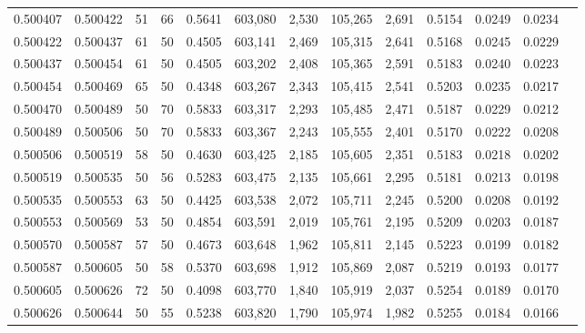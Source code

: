 \begin{tabular}{rrrrrrrrrrrrr}
0.500407 & 0.500422 &    51 &  66 &                                     0.5641 & 603,080 &   2,530 & 105,265 &   2,691 & 0.5154 & 0.0249 & 0.0234 \\
0.500422 & 0.500437 &    61 &  50 &                                     0.4505 & 603,141 &   2,469 & 105,315 &   2,641 & 0.5168 & 0.0245 & 0.0229 \\
0.500437 & 0.500454 &    61 &  50 &                                     0.4505 & 603,202 &   2,408 & 105,365 &   2,591 & 0.5183 & 0.0240 & 0.0223 \\
0.500454 & 0.500469 &    65 &  50 &                                     0.4348 & 603,267 &   2,343 & 105,415 &   2,541 & 0.5203 & 0.0235 & 0.0217 \\
0.500470 & 0.500489 &    50 &  70 &                                     0.5833 & 603,317 &   2,293 & 105,485 &   2,471 & 0.5187 & 0.0229 & 0.0212 \\
0.500489 & 0.500506 &    50 &  70 &                                     0.5833 & 603,367 &   2,243 & 105,555 &   2,401 & 0.5170 & 0.0222 & 0.0208 \\
0.500506 & 0.500519 &    58 &  50 &                                     0.4630 & 603,425 &   2,185 & 105,605 &   2,351 & 0.5183 & 0.0218 & 0.0202 \\
0.500519 & 0.500535 &    50 &  56 &                                     0.5283 & 603,475 &   2,135 & 105,661 &   2,295 & 0.5181 & 0.0213 & 0.0198 \\
0.500535 & 0.500553 &    63 &  50 &                                     0.4425 & 603,538 &   2,072 & 105,711 &   2,245 & 0.5200 & 0.0208 & 0.0192 \\
0.500553 & 0.500569 &    53 &  50 &                                     0.4854 & 603,591 &   2,019 & 105,761 &   2,195 & 0.5209 & 0.0203 & 0.0187 \\
0.500570 & 0.500587 &    57 &  50 &                                     0.4673 & 603,648 &   1,962 & 105,811 &   2,145 & 0.5223 & 0.0199 & 0.0182 \\
0.500587 & 0.500605 &    50 &  58 &                                     0.5370 & 603,698 &   1,912 & 105,869 &   2,087 & 0.5219 & 0.0193 & 0.0177 \\
0.500605 & 0.500626 &    72 &  50 &                                     0.4098 & 603,770 &   1,840 & 105,919 &   2,037 & 0.5254 & 0.0189 & 0.0170 \\
0.500626 & 0.500644 &    50 &  55 &                                     0.5238 & 603,820 &   1,790 & 105,974 &   1,982 & 0.5255 & 0.0184 & 0.0166 \\

\end{tabular}
